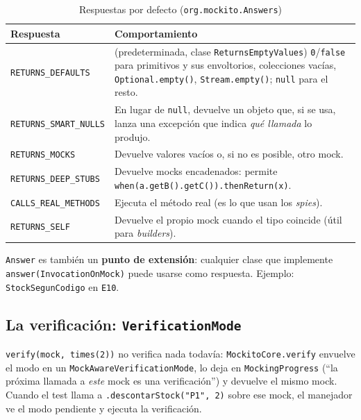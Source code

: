 \documentclass[11pt,a4paper,oneside]{report}
\newcommand{\code}[1]{\texttt{#1}}
\begin{document}
\begin{table}[H]
\centering
\caption{Respuestas por defecto (\code{org.mockito.Answers})}
\begin{tabularx}{\linewidth}{lX}
\toprule
\textbf{Respuesta} & \textbf{Comportamiento}\\
\midrule
\code{RETURNS\_DEFAULTS} & (predeterminada, clase \code{ReturnsEmptyValues}) \code{0}/\code{false} para primitivos y sus envoltorios, colecciones vacías, \code{Optional.empty()}, \code{Stream.empty()}; \code{null} para el resto.\\
\code{RETURNS\_SMART\_NULLS} & En lugar de \code{null}, devuelve un objeto que, si se usa, lanza una excepción que indica \emph{qué llamada} lo produjo.\\
\code{RETURNS\_MOCKS} & Devuelve valores vacíos o, si no es posible, otro mock.\\
\code{RETURNS\_DEEP\_STUBS} & Devuelve mocks encadenados: permite \code{when(a.getB().getC()).thenReturn(x)}.\\
\code{CALLS\_REAL\_METHODS} & Ejecuta el método real (es lo que usan los \emph{spies}).\\
\code{RETURNS\_SELF} & Devuelve el propio mock cuando el tipo coincide (útil para \emph{builders}).\\
\bottomrule
\end{tabularx}
\end{table}

\code{Answer} es también un \textbf{punto de extensión}: cualquier clase que implemente \code{answer(InvocationOnMock)} puede usarse como respuesta. Ejemplo: \code{StockSegunCodigo} en \code{E10}.

\subsection{La verificación: \code{VerificationMode}}
\code{verify(mock, times(2))} no verifica nada todavía: \code{MockitoCore.verify} envuelve el modo en un \code{MockAwareVerificationMode}, lo deja en \code{MockingProgress} (``la próxima llamada a \emph{este} mock es una verificación'') y devuelve el mismo mock. Cuando el test llama a \code{.descontarStock("P1", 2)} sobre ese mock, el manejador ve el modo pendiente y ejecuta la verificación.
\end{document}
